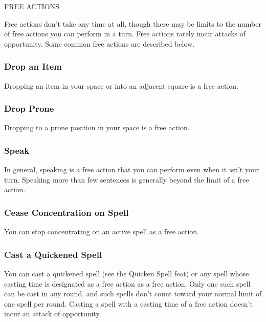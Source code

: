 \documentclass{article}
\begin{document}
\vspace{12pt}
FREE ACTIONS

Free actions don't take any time at all, though there may be limits to the number 
of free actions you can perform in a turn. Free actions rarely incur attacks of 
opportunity. Some common free actions are described below.

\vspace{12pt}
\subsubsection*{\textbf{Drop an Item}}

Dropping an item in your space or into an adjacent square is a free action.

\vspace{12pt}
\subsubsection*{\textbf{Drop Prone}}

Dropping to a prone position in your space is a free action.

\vspace{12pt}
\subsubsection*{\textbf{Speak}}

In general, speaking is a free action that you can perform even when it isn't your 
turn. Speaking more than few sentences is generally beyond the limit of a free 
action.

\vspace{12pt}
\subsubsection*{\textbf{Cease Concentration on Spell}}

You can stop concentrating on an active spell as a free action.

\vspace{12pt}
\subsubsection*{\textbf{Cast a Quickened Spell}}

You can cast a quickened spell (see the Quicken Spell feat) or any spell whose 
casting time is designated as a free action as a free action. Only one such spell 
can be cast in any round, and such spells don't count toward your normal limit 
of one spell per round. Casting a spell with a casting time of a free action doesn't 
incur an attack of opportunity.
\end{document}
